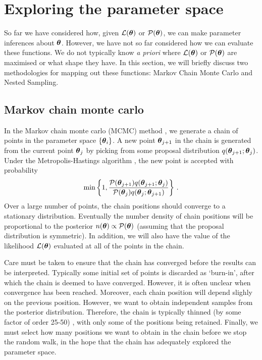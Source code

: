 \section{Exploring the parameter space}

So far we have considered how, given $\mathcal{L}(\boldsymbol\theta)$ or $\mathcal{P}(\boldsymbol\theta)$, we can make parameter inferences about $\boldsymbol\theta$. However, we have not so far considered how we can evaluate these functions. We do not typically know \textit{a priori} where $\mathcal{L}(\boldsymbol\theta)$ or $\mathcal{P}(\boldsymbol\theta)$ are maximised or what shape they have. In this section, we will briefly discuss two methodologies for mapping out these functions: Markov Chain Monte Carlo and Nested Sampling.

\subsection{Markov chain monte carlo}


In the Markov chain monte carlo (MCMC) method \cite{Lewis:2009}, we generate a chain of points in the parameter space $\left\{\boldsymbol\theta_i\right\}$. A new point $\boldsymbol\theta_{j+1}$ in the chain is generated from the current point $\boldsymbol\theta_{j}$ by picking from some proposal distribution $q(\boldsymbol\theta_{j+1}; \boldsymbol\theta_{j})$. Under the Metropolis-Hastings algorithm \cite{Metropolis:1953}, the new point is accepted with probability
\begin{equation}
\textrm{min}\left\{1, \frac{\mathcal{P}(\boldsymbol\theta_{j+1})q(\boldsymbol\theta_{j+1};\boldsymbol\theta_{j})}{\mathcal{P}(\boldsymbol\theta_{j})q(\boldsymbol\theta_{j};\boldsymbol\theta_{j+1})} \right\}\,.
\end{equation}
Over a large number of points, the chain positions should converge to a stationary distribution. Eventually the number density of chain positions will be proportional to the posterior \(n(\boldsymbol\theta) \propto \mathcal{P}(\boldsymbol\theta)\) (assuming that the proposal distribution is symmetric). In addition, we will also have the value of the likelihood $\mathcal{L}(\boldsymbol\theta)$ evaluated at all of the points in the chain.

Care must be taken to ensure that the chain has converged before the results can be interpreted. Typically some initial set of points is discarded as `burn-in', after which the chain is deemed to have converged. However, it is often unclear when convergence has been reached. Moreover, each chain position will depend slighly on the previous position. However, we want to obtain independent samples from the posterior distribution. Therefore, the chain is typically thinned (by some factor of order 25-50) \cite{Lewis:2002}, with only some of the positions being retained. Finally, we must select how many positions we want to obtain in the chain before we stop the random walk, in the hope that the chain has adequately explored the parameter space.

